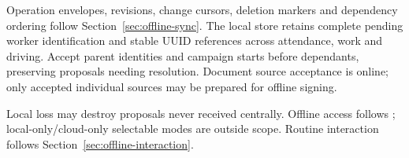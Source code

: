 Operation envelopes, revisions, change cursors, deletion markers and dependency
ordering follow Section~\ref{sec:offline-sync}. The local store retains complete
pending worker identification and stable UUID references across attendance, work
and driving. Accept parent identities and campaign starts before dependants,
preserving proposals needing resolution. Document source acceptance is online;
only accepted individual sources may be prepared for offline signing.

Local loss may destroy proposals never received centrally. Offline access follows
\hyperref[br:002]{}; local-only/cloud-only selectable modes are outside scope.
Routine interaction follows Section~\ref{sec:offline-interaction}.
